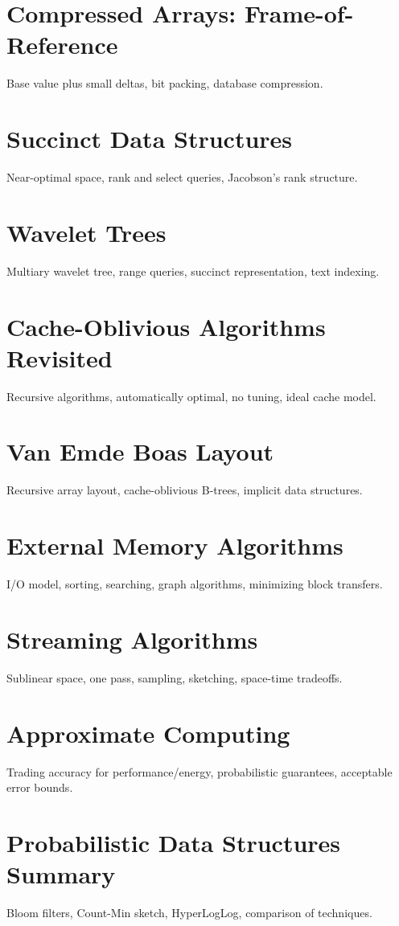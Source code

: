 \chapter{Compressed Arrays: Frame-of-Reference}
Base value plus small deltas, bit packing, database compression.

\chapter{Succinct Data Structures}
Near-optimal space, rank and select queries, Jacobson's rank structure.

\chapter{Wavelet Trees}
Multiary wavelet tree, range queries, succinct representation, text indexing.

\chapter{Cache-Oblivious Algorithms Revisited}
Recursive algorithms, automatically optimal, no tuning, ideal cache model.

\chapter{Van Emde Boas Layout}
Recursive array layout, cache-oblivious B-trees, implicit data structures.

\chapter{External Memory Algorithms}
I/O model, sorting, searching, graph algorithms, minimizing block transfers.

\chapter{Streaming Algorithms}
Sublinear space, one pass, sampling, sketching, space-time tradeoffs.

\chapter{Approximate Computing}
Trading accuracy for performance/energy, probabilistic guarantees, acceptable error bounds.

\chapter{Probabilistic Data Structures Summary}
Bloom filters, Count-Min sketch, HyperLogLog, comparison of techniques.

